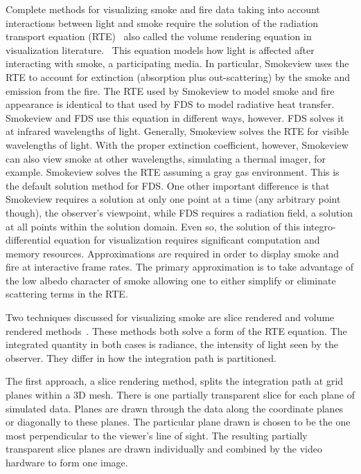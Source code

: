 Complete methods for visualizing smoke and fire data taking into account interactions between light and smoke require the solution of the radiation transport equation (RTE)~\cite{Siegel:2001} also called the volume rendering equation in visualization literature.~\cite{levoy:1988} This equation models how light is affected after interacting with smoke, a participating media. In particular, Smokeview uses the RTE to account for extinction (absorption plus out-scattering) by the smoke and emission from the fire.  The RTE used by Smokeview to model smoke and fire appearance is identical to that used by FDS to model radiative heat transfer.  Smokeview and FDS use this equation in different ways, however.  FDS solves it at infrared wavelengths of light.  Generally, Smokeview solves the RTE for visible wavelengths of light.  With the proper extinction coefficient, however, Smokeview can also view smoke at other wavelengths, simulating a thermal imager, for example. Smokeview solves the RTE assuming a gray gas environment.  This is the default solution method for FDS.  One other important difference is that Smokeview requires a solution at only one point at a time (any arbitrary point though), the observer's viewpoint, while FDS requires a radiation field, a solution at all points within the solution domain.  Even so, the solution of this integro-differential equation for visualization requires significant computation and memory  resources.  Approximations are required in order to display smoke and fire at interactive frame rates.  The primary approximation is to take advantage of the low albedo character of smoke allowing one to either simplify or eliminate scattering terms in the RTE.

Two techniques discussed for visualizing smoke are slice rendered and volume rendered methods~\cite{levoy:1988,Engel:2006}.    These methods both solve a form of the RTE equation.  The integrated quantity in both cases is radiance, the intensity of light seen by the observer.  They differ in how the integration path is partitioned.

The first approach, a slice rendering method,  splits the integration path at grid planes within a 3D mesh. There is one partially transparent slice for each plane of simulated data. Planes are drawn through the data along the coordinate planes or diagonally to these  planes.   The particular plane drawn is chosen to be the one most perpendicular to the viewer's line of sight.  The resulting partially transparent slice planes are drawn individually and combined by the video hardware to form one image.

